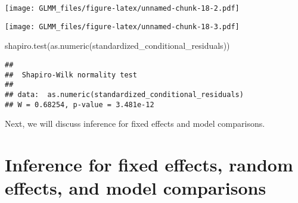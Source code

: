 \documentclass[
]{book}
\newenvironment{Shaded}{\begin{snugshade}}{\end{snugshade}}
\newcommand{\FunctionTok}[1]{\textcolor[rgb]{0.00,0.00,0.00}{#1}}
\newcommand{\NormalTok}[1]{#1}
\newcommand{\OtherTok}[1]{\textcolor[rgb]{0.56,0.35,0.01}{#1}}
\newcommand{\SpecialCharTok}[1]{\textcolor[rgb]{0.00,0.00,0.00}{#1}}
\begin{document}
\texttt{[image: GLMM\_files/figure-latex/unnamed-chunk-18-2.pdf]}

\begin{Shaded}
\end{Shaded}

\texttt{[image: GLMM\_files/figure-latex/unnamed-chunk-18-3.pdf]}

\begin{Shaded}
\begin{Highlighting}[]
\FunctionTok{shapiro.test}\NormalTok{(}\FunctionTok{as.numeric}\NormalTok{(standardized\_conditional\_residuals))}
\end{Highlighting}
\end{Shaded}

\begin{verbatim}
## 
##  Shapiro-Wilk normality test
## 
## data:  as.numeric(standardized_conditional_residuals)
## W = 0.68254, p-value = 3.481e-12
\end{verbatim}

Next, we will discuss inference for fixed effects and model comparisons.

\hypertarget{inference-for-fixed-effects-random-effects-and-model-comparisons}{%
\section{Inference for fixed effects, random effects, and model comparisons}\label{inference-for-fixed-effects-random-effects-and-model-comparisons}}
\end{document}
